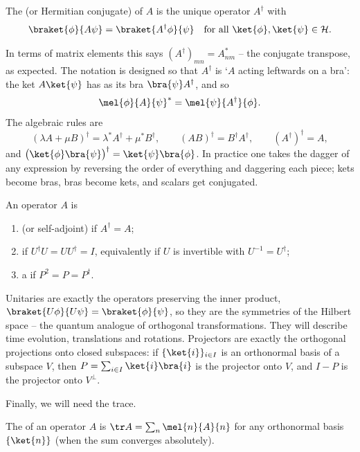 \begin{definition}[Adjoint]
    The  (or Hermitian conjugate) of $A$ is the unique operator $A^\dagger$ with
    $$
    \braket{\phi}{A\psi} = \braket{A^\dagger \phi}{\psi} \quad \text{for all } \ket{\phi}, \ket{\psi} \in \mathcal{H}.
    $$
\end{definition}

In terms of matrix elements this says $(A^\dagger)_{mn} = A_{nm}^*$ -- the conjugate transpose, as expected. The notation is designed so that $A^\dagger$ is `$A$ acting leftwards on a bra': the ket $A\ket{\psi}$ has as its bra $\bra{\psi}A^\dagger$, and so
$$
\mel{\phi}{A}{\psi}^* = \mel{\psi}{A^\dagger}{\phi}.
$$
The algebraic rules are
$$
(\lambda A + \mu B)^\dagger = \lambda^* A^\dagger + \mu^* B^\dagger, \qquad (AB)^\dagger = B^\dagger A^\dagger, \qquad (A^\dagger)^\dagger = A,
$$
and $\big(\ket{\phi}\bra{\psi}\big)^\dagger = \ket{\psi}\bra{\phi}$. In practice one takes the dagger of any expression by reversing the order of everything and daggering each piece; kets become bras, bras become kets, and scalars get conjugated.

\begin{definition}
    An operator $A$ is
    \begin{enumerate}[label=(\roman*)]
        \item {} (or self-adjoint) if $A^\dagger = A$;
        \item {} if $U^\dagger U = U U^\dagger = I$, equivalently if $U$ is invertible with $U^{-1} = U^\dagger$;
        \item a  if $P^2 = P = P^\dagger$.
    \end{enumerate}
\end{definition}

Unitaries are exactly the operators preserving the inner product, $\braket{U\phi}{U\psi} = \braket{\phi}{\psi}$, so they are the symmetries of the Hilbert space -- the quantum analogue of orthogonal transformations. They will describe time evolution, translations and rotations. Projectors are exactly the orthogonal projections onto closed subspaces: if $\{\ket{i}\}_{i \in I}$ is an orthonormal basis of a subspace $V$, then $P = \sum_{i \in I}\ket{i}\bra{i}$ is the projector onto $V$, and $I - P$ is the projector onto $V^\perp$.

Finally, we will need the trace.

\begin{definition}[Trace]
    The  of an operator $A$ is $\tr A = \sum_n \mel{n}{A}{n}$ for any orthonormal basis $\{\ket{n}\}$ (when the sum converges absolutely).
\end{definition}


